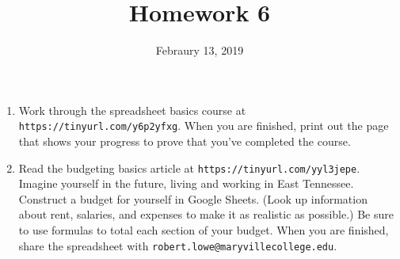 \documentclass{article}
\title{Homework 6}
\date{Febraury 13, 2019}
\begin{document}
\maketitle

\begin{enumerate}
\item Work through the spreadsheet basics course at {\tt https://tinyurl.com/y6p2yfxg}.
When you are finished, print out the page that shows your progress to prove that you've completed the course.

\item Read the budgeting basics article at {\tt https://tinyurl.com/yyl3jepe}.  
Imagine yourself in the future, living and working in East Tennessee.  Construct a budget
for yourself in Google Sheets.  (Look up information about rent, salaries, and expenses to make it as realistic as possible.)  Be sure to use formulas to total each section of your 
budget.  When you are finished, share the spreadsheet with {\tt robert.lowe@maryvillecollege.edu}.

\end{enumerate}
\end{document}
